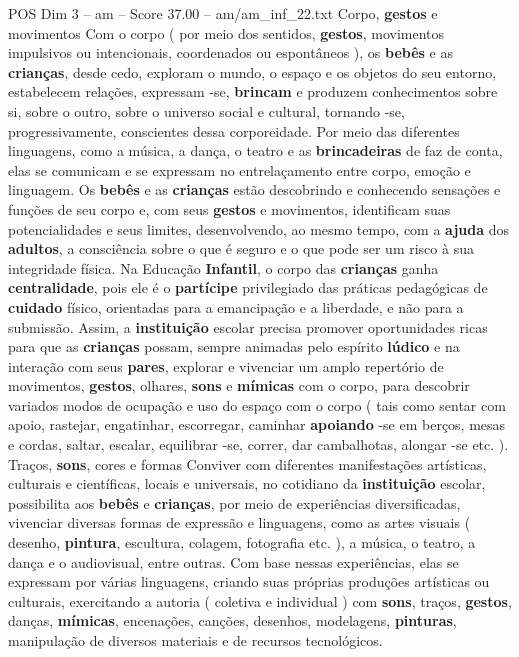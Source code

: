 \begin{textsample}{POS Dim 3 – am – Score 37.00 – am/am\_inf\_22.txt}
Corpo, \textbf{gestos} e movimentos Com o corpo ( por meio dos sentidos, \textbf{gestos}, movimentos impulsivos ou intencionais, coordenados ou espontâneos ), os \textbf{bebês} e as \textbf{crianças}, desde cedo, exploram o mundo, o espaço e os objetos do seu entorno, estabelecem relações, expressam -se, \textbf{brincam} e produzem conhecimentos sobre si, sobre o outro, sobre o universo social e cultural, tornando -se, progressivamente, conscientes dessa corporeidade.
Por meio das diferentes linguagens, como a música, a dança, o teatro e as \textbf{brincadeiras} de faz de conta, elas se comunicam e se expressam no entrelaçamento entre corpo, emoção e linguagem.
Os \textbf{bebês} e as \textbf{crianças} estão descobrindo e conhecendo sensações e funções de seu corpo e, com seus \textbf{gestos} e movimentos, identificam suas potencialidades e seus limites, desenvolvendo, ao mesmo tempo, com a \textbf{ajuda} dos \textbf{adultos}, a consciência sobre o que é seguro e o que pode ser um risco à sua integridade física.
Na Educação \textbf{Infantil}, o corpo das \textbf{crianças} ganha \textbf{centralidade}, pois ele é o \textbf{partícipe} privilegiado das práticas pedagógicas de \textbf{cuidado} físico, orientadas para a emancipação e a liberdade, e não para a submissão.
Assim, a \textbf{instituição} escolar precisa promover oportunidades ricas para que as \textbf{crianças} possam, sempre animadas pelo espírito \textbf{lúdico} e na interação com seus \textbf{pares}, explorar e vivenciar um amplo repertório de movimentos, \textbf{gestos}, olhares, \textbf{sons} e \textbf{mímicas} com o corpo, para descobrir variados modos de ocupação e uso do espaço com o corpo ( tais como sentar com apoio, rastejar, engatinhar, escorregar, caminhar \textbf{apoiando} -se em berços, mesas e cordas, saltar, escalar, equilibrar -se, correr, dar cambalhotas, alongar -se etc. ).
Traços, \textbf{sons}, cores e formas Conviver com diferentes manifestações artísticas, culturais e científicas, locais e universais, no cotidiano da \textbf{instituição} escolar, possibilita aos \textbf{bebês} e \textbf{crianças}, por meio de experiências diversificadas, vivenciar diversas formas de expressão e linguagens, como as artes visuais ( desenho, \textbf{pintura}, escultura, colagem, fotografia etc. ), a música, o teatro, a dança e o audiovisual, entre outras.
Com base nessas experiências, elas se expressam por várias linguagens, criando suas próprias produções artísticas ou culturais, exercitando a autoria ( coletiva e individual ) com \textbf{sons}, traços, \textbf{gestos}, danças, \textbf{mímicas}, encenações, canções, desenhos, modelagens, \textbf{pinturas}, manipulação de diversos materiais e de recursos tecnológicos.

\end{textsample}

